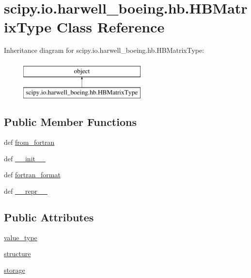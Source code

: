 \hypertarget{classscipy_1_1io_1_1harwell__boeing_1_1hb_1_1HBMatrixType}{}\section{scipy.\+io.\+harwell\+\_\+boeing.\+hb.\+H\+B\+Matrix\+Type Class Reference}
\label{classscipy_1_1io_1_1harwell__boeing_1_1hb_1_1HBMatrixType}
Inheritance diagram for scipy.\+io.\+harwell\+\_\+boeing.\+hb.\+H\+B\+Matrix\+Type\+:\begin{figure}[H]
\begin{center}
\leavevmode
\includegraphics[height=2.000000cm]{classscipy_1_1io_1_1harwell__boeing_1_1hb_1_1HBMatrixType}
\end{center}
\end{figure}
\subsection*{Public Member Functions}
\begin{DoxyCompactItemize}
\item 
def \hyperlink{classscipy_1_1io_1_1harwell__boeing_1_1hb_1_1HBMatrixType_a145b7917c439dbba93edfca7a070f743}{from\+\_\+fortran}
\item 
def \hyperlink{classscipy_1_1io_1_1harwell__boeing_1_1hb_1_1HBMatrixType_abe69cdf056537e68d93b2e0cafa0230e}{\+\_\+\+\_\+init\+\_\+\+\_\+}
\item 
def \hyperlink{classscipy_1_1io_1_1harwell__boeing_1_1hb_1_1HBMatrixType_ae2cbdb24578e6cfe5f2e472acc2625b8}{fortran\+\_\+format}
\item 
def \hyperlink{classscipy_1_1io_1_1harwell__boeing_1_1hb_1_1HBMatrixType_a1b5aaeaae738c4ce97e3e1dae66efd80}{\+\_\+\+\_\+repr\+\_\+\+\_\+}
\end{DoxyCompactItemize}
\subsection*{Public Attributes}
\begin{DoxyCompactItemize}
\item 
\hyperlink{classscipy_1_1io_1_1harwell__boeing_1_1hb_1_1HBMatrixType_a9c630c8b9b3a6736189d0e9517f22498}{value\+\_\+type}
\item 
\hyperlink{classscipy_1_1io_1_1harwell__boeing_1_1hb_1_1HBMatrixType_a7ad583c021bb389ebe4f332b27c99560}{structure}
\item 
\hyperlink{classscipy_1_1io_1_1harwell__boeing_1_1hb_1_1HBMatrixType_a87a2b1eb06b716095b2e02cc2989e844}{storage}
\end{DoxyCompactItemize}


